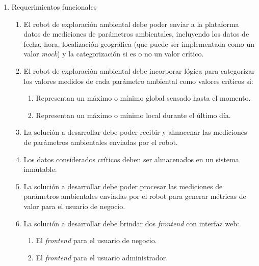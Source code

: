 \begin{enumerate}	
	\item Requerimientos funcionales		
	\begin{enumerate}	
		
		\item El robot de exploración ambiental debe poder enviar a la plataforma datos de mediciones de parámetros ambientales, incluyendo los datos de fecha, hora, localización geográfica (que puede ser implementada como un valor \textit{mock}) y la categorización si es o no un valor crítico.
		\item El robot de exploración ambiental debe incorporar lógica para categorizar los valores medidos de cada parámetro ambiental como valores críticos si:
		\begin{enumerate}				
			\item Representan un máximo o mínimo global sensado hasta el momento.				
			\item Representan un máximo o mínimo local durante el último día.				
		\end{enumerate}			
		\item La solución a desarrollar debe poder recibir y almacenar las mediciones de parámetros ambientales enviadas por el robot.
		\item Los datos considerados críticos deben ser almacenados en un sistema inmutable.
		\item La solución a desarrollar debe poder procesar las mediciones de parámetros ambientales enviadas por el robot para generar métricas de valor para el usuario de negocio.		
		\item La solución a desarrollar debe brindar dos \textit{frontend} con interfaz web:
			\begin{enumerate}				
				\item El \textit{frontend} para el usuario de negocio.				
				\item El \textit{frontend} para el usuario administrador.				
			\end{enumerate}			
		

\end{enumerate}
\end{enumerate}
